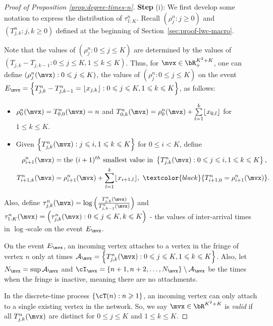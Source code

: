 \documentclass[letterpaper,11pt,reqno]{amsart}
\theoremstyle{definition}
\renewcommand{\le}{\leqslant}
\renewcommand{\leq}{\leqslant}
\renewcommand{\geq}{\geqslant}
\newcommand{\set}[1]{\left\{#1\right\}}
\newcommand{\cA}{\mathcal{A}}\newcommand{\cB}{\mathcal{B}}\newcommand{\cC}{\mathcal{C}}
\begin{document}
\begin{proof}[Proof of Proposition \ref{prop:degree-times-n}]
    
\noindent \textbf{Step} (i): We first develop some notation to express the distribution of $\tau^n_{1:K}$. Recall $(\rho_j^n:j\geq 0)$ and $(T_{j,k}^n: j,k\geq 0)$ defined at the beginning of Section~\ref{sec:proof-lwc-macro}.


     Note that the values of $(\rho_j^n:0\leq j\leq K)$ are determined by the values of $(T_{j,k}-T_{j,k-1}: 0\leq j\leq K, 1 \leq k \leq K)$. Thus, for $\mvx \in \bR^{K^2+K}_+$, one can define $(\rho_j^n(\mvx):0\leq j\leq K)$, the values of $(\rho^n_j:0\leq j\leq K)$ on the event $E_{\mvx} = \set{T^n_{j,k}-T^n_{j,k-1} = \lfloor x_{j,k}\rfloor :0\leq j\leq K, 1\leq k\leq K}$, as follows:
    \begin{itemize}
    \item \textcolor{black}{$\rho_0^n(\mvx) = T^n_{0,0}(\mvx) = n$} and $T^n_{0,k}(\mvx) = \rho_0^n(\mvx) + \sum\limits_{l=1}^k \lfloor x_{0,l}\rfloor $ for $1 \le k\leq K$.
    \item Given $\set{T_{j,k}^n(\mvx):j\leq i,1\leq k\leq K}$ for $0 \le i < K$, define \begin{align*}
        \rho^n_{i+1}(\mvx) &= \text{the }(i+1)^{th} \text{ smallest value in }\set{T_{j,k}^n(\mvx):0\leq j\leq i,1\leq k\leq K},\\
        T_{i+1,k}^n(\mvx) &=  \rho^n_{i+1}(\mvx) + \sum\limits_{l=1}^k \lfloor x_{i+1,l}\rfloor, \ \textcolor{black}{T^n_{i+1,0} = \rho^n_{i+1}(\mvx)}.
    \end{align*}
\end{itemize} 
Also, define $\tau^n_{j,k}(\mvx) = \log\left(\frac{T_{j,k}^n(\mvx)}{T_{j,k-1}^n(\mvx)}\right)$ and $\tau^n_{1:K}(\mvx) = \left(\tau^n_{j,k}(\mvx):0\leq j\leq K, k\leq K\right)$ - the values of inter-arrival times in $\log$-scale on the event $E_{\mvx}$. 

 On the event $E_{\mvx}$, an incoming vertex  attaches to a vertex in the fringe of vertex $n$ only at times $
    \cA_{\mvx} = \set{T^n_{j,k}(\mvx):0\leq j\leq K, 1\leq k\leq K }$. Also, let $
    N_{\mvx} =\sup \cA_{\mvx}$ and $
    \cI_{\mvx} = \set{n+1,n+2,\dots,N_{\mvx}}\setminus\cA_{\mvx}$ be the times when the fringe is inactive, meaning there are no attachments.
    
In the discrete-time process $\set{\cT(n):n\geq 1}$, an incoming vertex can only attach to a single existing vertex in the network. So, we say $\mvx \in \bR^{K^2+K}$ is \emph{valid} if all $T_{j,k}^n(\mvx)$ are distinct for $0\leq j\leq K$ and $1\leq k\leq K$. 


\end{proof}
\end{document}
